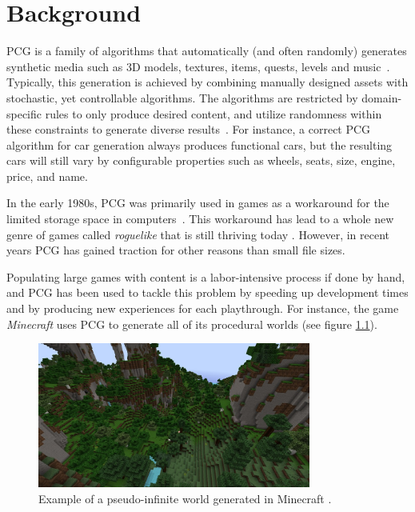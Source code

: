 \chapter{Background}


PCG is a family of algorithms that automatically (and often randomly) generates synthetic media such as 3D models, textures, items, quests, levels and music~\cite[p.1]{pcg_in_games}.
Typically, this generation is achieved by combining manually designed assets with stochastic, yet controllable algorithms.
The algorithms are restricted by domain-specific rules to only produce desired content, and utilize randomness within these constraints to generate diverse results~\cite{gamasutra}.
For instance, a correct PCG algorithm for car generation always produces functional cars, but the resulting cars will still vary by configurable properties such as wheels, seats, size, engine, price, and name.

In the early 1980s, PCG was primarily used in games as a workaround for the limited storage space in computers~\cite[p.4]{pcg_in_games}.
This workaround has lead to a whole new genre of games called \textit{roguelike} that is still thriving today \cite{roguelikes}.
However, in recent years PCG has gained traction for other reasons than small file sizes.

Populating large games with content is a labor-intensive process if done by hand, and PCG has been used to tackle this problem by speeding up development times and by producing new experiences for each playthrough.
For instance, the game \textit{Minecraft} \cite{minecraft} uses PCG to generate all of its procedural worlds (see figure \ref{fig:minecraft}).

\begin{figure}[h!]
  \centering

  \includegraphics[width=0.8\textwidth]{figure/minecraft.jpg}
  \caption{Example of a pseudo-infinite world generated in Minecraft \cite{minecraft_img}.}

  \label{fig:minecraft}
\end{figure}

